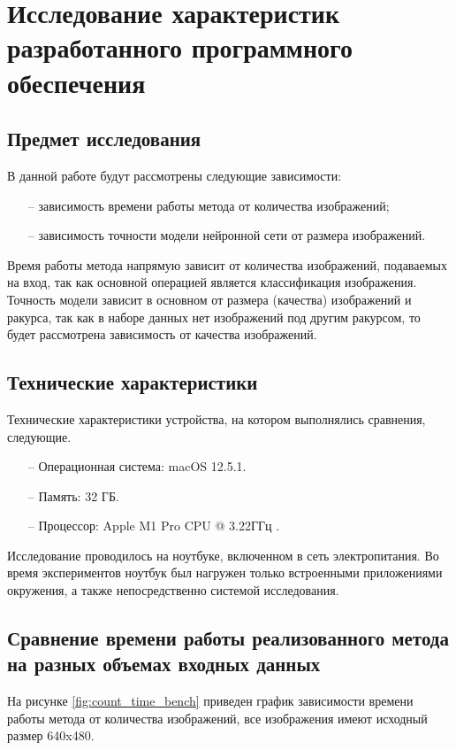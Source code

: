 \section{Исследование характеристик разработанного программного обеспечения}
\subsection{Предмет исследования}
В данной работе будут рассмотрены следующие зависимости:
\begin{itemize}[leftmargin=1.6\parindent]
	\item[--] зависимость времени работы метода от количества изображений;
	\item[--] зависимость точности модели нейронной сети от размера изображений.
\end{itemize}

Время работы метода напрямую зависит от количества изображений, подаваемых на вход, так как основной операцией является классификация изображения. Точность модели зависит в основном от размера (качества) изображений и ракурса, так как в наборе данных нет изображений под другим ракурсом, то будет рассмотрена зависимость от качества изображений.

\subsection*{Технические характеристики}
Технические характеристики устройства, на котором выполнялись сравнения, следующие.

\begin{itemize}
	\item[--] Операционная система: macOS 12.5.1.
	\item[--] Память: 32 ГБ.
	\item[--] Процессор: Apple M1 Pro CPU @ 3.22ГГц \cite{apple}.
\end{itemize}
Исследование проводилось на ноутбуке, включенном в сеть электропитания. Во время экспериментов ноутбук был нагружен только встроенными приложениями окружения, а также непосредственно системой исследования.

\subsection{Сравнение времени работы реализованного метода на разных объемах входных данных}
На рисунке \ref{fig:count_time_bench} приведен график зависимости времени работы метода от количества изображений, все изображения имеют исходный размер 640x480.

